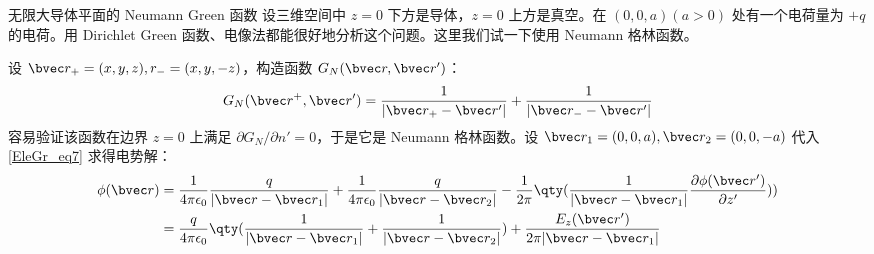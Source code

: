 \begin{example}{无限大导体平面的 Neumann Green 函数}
设三维空间中 $z=0$ 下方是导体，$z=0$ 上方是真空。在 $(0,0,a)(a>0)$ 处有一个电荷量为 $+q$ 的电荷。用 Dirichlet Green 函数、电像法都能很好地分析这个问题。这里我们试一下使用 Neumann 格林函数。

设 $\bvec r_+=(x,y,z),r_-=(x,y,-z)$，构造函数 $G_N(\bvec r,\bvec r')$：
\begin{equation}
G_N(\bvec r^+,\bvec r')=\frac{1}{|\bvec r_+-\bvec r'|}+\frac{1}{|\bvec r_--\bvec r'|}
\end{equation}
容易验证该函数在边界 $z=0$ 上满足 $\partial G_N/\partial n'=0$，于是它是 Neumann 格林函数。设 $\bvec r_1=(0,0,a),\bvec r_2=(0,0,-a)$ 代入\autoref{EleGr_eq7} 求得电势解：
\begin{equation}
\begin{aligned}
\phi(\bvec r)&=\frac{1}{4\pi\epsilon_0}\frac{q}{|\bvec r-\bvec r_1|}+\frac{1}{4\pi\epsilon_0}\frac{q}{|\bvec r-\bvec r_2|}-\frac{1}{2\pi}\qty(\frac{1}{|\bvec r-\bvec r_1|}\frac{\partial \phi(\bvec r')}{\partial z'}))\\
&=\frac{q}{4\pi\epsilon_0}\qty(\frac{1}{|\bvec r-\bvec r_1|}+\frac{1}{|\bvec r-\bvec r_2|})+\frac{E_z(\bvec r')}{2\pi|\bvec r-\bvec r_1|}
\end{aligned}
\end{equation}

\end{example}
